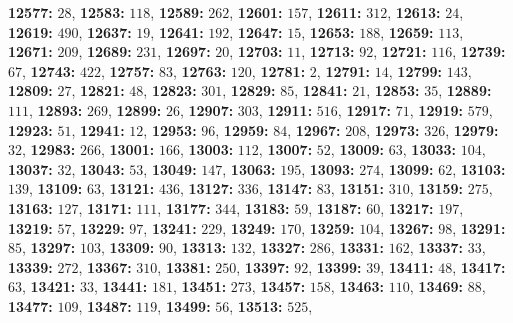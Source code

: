 \textsf{\bfseries 12577:} $28$, \textsf{\bfseries 12583:} $118$, \textsf{\bfseries 12589:} $262$, \textsf{\bfseries 12601:} $157$, \textsf{\bfseries 12611:} $312$, \textsf{\bfseries 12613:} $24$, \textsf{\bfseries 12619:} $490$, \textsf{\bfseries 12637:} $19$, \textsf{\bfseries 12641:} $192$, \textsf{\bfseries 12647:} $15$, \textsf{\bfseries 12653:} $188$, \textsf{\bfseries 12659:} $113$, \textsf{\bfseries 12671:} $209$, \textsf{\bfseries 12689:} $231$, \textsf{\bfseries 12697:} $20$, \textsf{\bfseries 12703:} $11$, \textsf{\bfseries 12713:} $92$, \textsf{\bfseries 12721:} $116$, \textsf{\bfseries 12739:} $67$, \textsf{\bfseries 12743:} $422$, \textsf{\bfseries 12757:} $83$, \textsf{\bfseries 12763:} $120$, \textsf{\bfseries 12781:} $2$, \textsf{\bfseries 12791:} $14$, \textsf{\bfseries 12799:} $143$, \textsf{\bfseries 12809:} $27$, \textsf{\bfseries 12821:} $48$, \textsf{\bfseries 12823:} $301$, \textsf{\bfseries 12829:} $85$, \textsf{\bfseries 12841:} $21$, \textsf{\bfseries 12853:} $35$, \textsf{\bfseries 12889:} $111$, \textsf{\bfseries 12893:} $269$, \textsf{\bfseries 12899:} $26$, \textsf{\bfseries 12907:} $303$, \textsf{\bfseries 12911:} $516$, \textsf{\bfseries 12917:} $71$, \textsf{\bfseries 12919:} $579$, \textsf{\bfseries 12923:} $51$, \textsf{\bfseries 12941:} $12$, \textsf{\bfseries 12953:} $96$, \textsf{\bfseries 12959:} $84$, \textsf{\bfseries 12967:} $208$, \textsf{\bfseries 12973:} $326$, \textsf{\bfseries 12979:} $32$, \textsf{\bfseries 12983:} $266$, \textsf{\bfseries 13001:} $166$, \textsf{\bfseries 13003:} $112$, \textsf{\bfseries 13007:} $52$, \textsf{\bfseries 13009:} $63$, \textsf{\bfseries 13033:} $104$, \textsf{\bfseries 13037:} $32$, \textsf{\bfseries 13043:} $53$, \textsf{\bfseries 13049:} $147$, \textsf{\bfseries 13063:} $195$, \textsf{\bfseries 13093:} $274$, \textsf{\bfseries 13099:} $62$, \textsf{\bfseries 13103:} $139$, \textsf{\bfseries 13109:} $63$, \textsf{\bfseries 13121:} $436$, \textsf{\bfseries 13127:} $336$, \textsf{\bfseries 13147:} $83$, \textsf{\bfseries 13151:} $310$, \textsf{\bfseries 13159:} $275$, \textsf{\bfseries 13163:} $127$, \textsf{\bfseries 13171:} $111$, \textsf{\bfseries 13177:} $344$, \textsf{\bfseries 13183:} $59$, \textsf{\bfseries 13187:} $60$, \textsf{\bfseries 13217:} $197$, \textsf{\bfseries 13219:} $57$, \textsf{\bfseries 13229:} $97$, \textsf{\bfseries 13241:} $229$, \textsf{\bfseries 13249:} $170$, \textsf{\bfseries 13259:} $104$, \textsf{\bfseries 13267:} $98$, \textsf{\bfseries 13291:} $85$, \textsf{\bfseries 13297:} $103$, \textsf{\bfseries 13309:} $90$, \textsf{\bfseries 13313:} $132$, \textsf{\bfseries 13327:} $286$, \textsf{\bfseries 13331:} $162$, \textsf{\bfseries 13337:} $33$, \textsf{\bfseries 13339:} $272$, \textsf{\bfseries 13367:} $310$, \textsf{\bfseries 13381:} $250$, \textsf{\bfseries 13397:} $92$, \textsf{\bfseries 13399:} $39$, \textsf{\bfseries 13411:} $48$, \textsf{\bfseries 13417:} $63$, \textsf{\bfseries 13421:} $33$, \textsf{\bfseries 13441:} $181$, \textsf{\bfseries 13451:} $273$, \textsf{\bfseries 13457:} $158$, \textsf{\bfseries 13463:} $110$, \textsf{\bfseries 13469:} $88$, \textsf{\bfseries 13477:} $109$, \textsf{\bfseries 13487:} $119$, \textsf{\bfseries 13499:} $56$, \textsf{\bfseries 13513:} $525$, 
